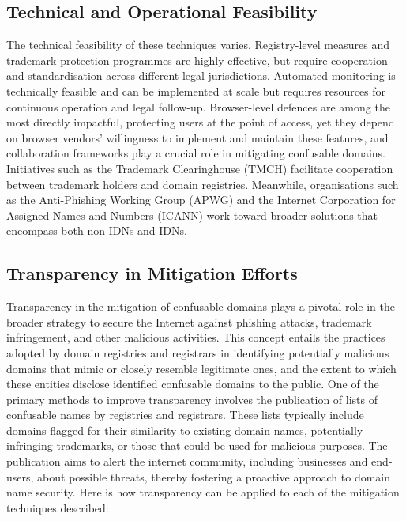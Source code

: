 \subsection{Technical and Operational Feasibility}
The technical feasibility of these techniques varies. Registry-level measures and trademark protection programmes are highly effective, but require cooperation and standardisation across different legal jurisdictions. Automated monitoring is technically feasible and can be implemented at scale but requires resources for continuous operation and legal follow-up. Browser-level defences are among the most directly impactful, protecting users at the point of access, yet they depend on browser vendors' willingness to implement and maintain these features, and collaboration frameworks play a crucial role in mitigating confusable domains. Initiatives such as the Trademark Clearinghouse (TMCH) facilitate cooperation between trademark holders and domain registries. Meanwhile, organisations such as the Anti-Phishing Working Group (APWG) and the Internet Corporation for Assigned Names and Numbers (ICANN) work toward broader solutions that encompass both non-IDNs and IDNs.

\subsection{ Transparency in Mitigation Efforts}

Transparency in the mitigation of confusable domains plays a pivotal role in the broader strategy to secure the Internet against phishing attacks, trademark infringement, and other malicious activities. This concept entails the practices adopted by domain registries and registrars in identifying potentially malicious domains that mimic or closely resemble legitimate ones, and the extent to which these entities disclose identified confusable domains to the public. One of the primary methods to improve transparency involves the publication of lists of confusable names by registries and registrars. These lists typically include domains flagged for their similarity to existing domain names, potentially infringing trademarks, or those that could be used for malicious purposes. The publication aims to alert the internet community, including businesses and end-users, about possible threats, thereby fostering a proactive approach to domain name security. Here is how transparency can be applied to each of the mitigation techniques described:

